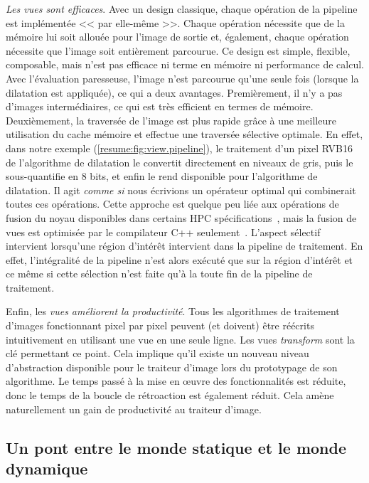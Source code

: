 \emph{Les vues sont efficaces}. Avec un design classique, chaque opération de la pipeline est implémentée << par
elle-même >>. Chaque opération nécessite que de la mémoire lui soit allouée pour l'image de sortie et, également, chaque
opération nécessite que l'image soit entièrement parcourue. Ce design est simple, flexible, composable, mais n'est pas
efficace ni terme en mémoire ni performance de calcul. Avec l'évaluation paresseuse, l'image n'est parcourue qu'une
seule fois (lorsque la dilatation est appliquée), ce qui a deux avantages. Premièrement, il n'y a pas d'images
intermédiaires, ce qui est très efficient en termes de mémoire. Deuxièmement, la traversée de l'image est plus rapide
grâce à une meilleure utilisation du cache mémoire et effectue une traversée sélective optimale. En effet, dans notre
exemple (\cref{resume:fig:view.pipeline}), le traitement d'un pixel RVB16 de l'algorithme de dilatation le convertit
directement en niveaux de gris, puis le sous-quantifie en 8 bits, et enfin le rend disponible pour l'algorithme de
dilatation. Il agit \emph{comme si} nous écrivions un opérateur optimal qui combinerait toutes ces opérations. Cette
approche est quelque peu liée aux opérations de fusion du noyau disponibles dans certains HPC
spécifications~\parencite{openvx.2019}, mais la fusion de vues est optimisée par le compilateur C++
seulement~\parencite{brown.2018.ranges}. L'aspect sélectif intervient lorsqu'une région d'intérêt intervient dans la
pipeline de traitement. En effet, l'intégralité de la pipeline n'est alors exécuté que sur la région d'intérêt et ce
même si cette sélection n'est faite qu'à la toute fin de la pipeline de traitement.

Enfin, les \emph{vues améliorent la productivité}. Tous les algorithmes de traitement d'images fonctionnant pixel par
pixel peuvent (et doivent) être réécrits intuitivement en utilisant une vue en une seule ligne. Les vues
\emph{transform} sont la clé permettant ce point. Cela implique qu'il existe un nouveau niveau d'abstraction disponible
pour le traiteur d'image lors du prototypage de son algorithme. Le temps passé à la mise en \oe{}uvre des
fonctionnalités est réduite, donc le temps de la boucle de rétroaction est également réduit. Cela amène naturellement un
gain de productivité au traiteur d'image.


\subsection*{Un pont entre le monde statique et le monde dynamique}



